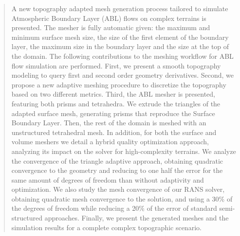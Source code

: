 \documentclass[1p]{elsarticle}
\begin{document}
\begin{frontmatter}
\begin{abstract}
A new topography adapted mesh generation process tailored to simulate Atmospheric Boundary Layer (ABL) flows on complex terrains is presented.
 The mesher is fully automatic given: the maximum and minimum surface mesh size, the size of the first element of the boundary layer, the maximum size in the boundary layer and the size at the top of the domain. The following contributions to the meshing workflow for ABL flow simulation are performed. First, we present a smooth topography modeling to query first and second order geometry derivatives. Second, we propose  a new adaptive meshing procedure to discretize the topography  based on two different metrics. Third, the ABL mesher is presented, featuring both prisms and tetrahedra. We extrude the triangles of the adapted surface mesh, generating prisms that reproduce the Surface Boundary Layer. Then, the rest of the domain is meshed with an unstructured tetrahedral mesh. In addition, for both the surface and volume meshers we detail a hybrid quality optimization approach, analyzing its impact on the solver for high-complexity terrains. We analyze the convergence of the triangle adaptive approach, obtaining quadratic convergence to the geometry and reducing to one half the error for the same amount of degrees of freedom than without adaptivity and optimization. We also study the mesh convergence of our RANS solver, obtaining quadratic mesh convergence to the solution, and using a 30\% of the degrees of freedom while reducing a 20\% of the error of standard semi-structured approaches. Finally, we present the generated meshes and the simulation results for a complete complex topographic scenario.
\end{abstract}



\end{frontmatter}
\end{document}
